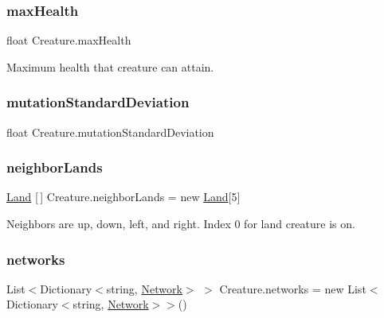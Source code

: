 \mbox{\label{class_creature_ad894d0485d7bbd02a52893fe5d24a462}} 
\subsubsection{\texorpdfstring{max\+Health}{maxHealth}}
{\footnotesize\ttfamily float Creature.\+max\+Health}



Maximum health that creature can attain. 

\mbox{\label{class_creature_a7da8e444fb731af8e632b730d72e4215}} 
\subsubsection{\texorpdfstring{mutation\+Standard\+Deviation}{mutationStandardDeviation}}
{\footnotesize\ttfamily float Creature.\+mutation\+Standard\+Deviation}

\mbox{\label{class_creature_a6b427ac086b4cca5ed85553942e01d71}} 
\subsubsection{\texorpdfstring{neighbor\+Lands}{neighborLands}}
{\footnotesize\ttfamily \mbox{\hyperlink{class_land}{Land}} \mbox{[}$\,$\mbox{]} Creature.\+neighbor\+Lands = new \mbox{\hyperlink{class_land}{Land}}\mbox{[}5\mbox{]}}



Neighbors are up, down, left, and right. Index 0 for land creature is on. 

\mbox{\label{class_creature_a1caf157811e3a3b37f9b292560aa0552}} 
\subsubsection{\texorpdfstring{networks}{networks}}
{\footnotesize\ttfamily List$<$Dictionary$<$string, \mbox{\hyperlink{class_network}{Network}}$>$ $>$ Creature.\+networks = new List$<$Dictionary$<$string, \mbox{\hyperlink{class_network}{Network}}$>$$>$()}



